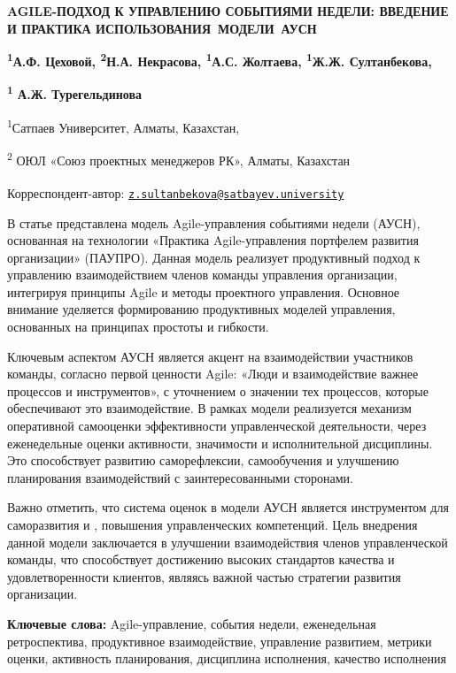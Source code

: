 


{\bfseries AGILE-ПОДХОД К УПРАВЛЕНИЮ СОБЫТИЯМИ НЕДЕЛИ: ВВЕДЕНИЕ И ПРАКТИКА
ИСПОЛЬЗОВАНИЯ~МОДЕЛИ~АУСН}

{\bfseries \textsuperscript{1}А.Ф. Цеховой, \textsuperscript{2}Н.А.
Некрасова, \textsuperscript{1}А.С. Жолтаева, \textsuperscript{1}Ж.Ж.
Султанбекова\textsuperscript{\envelope },}

{\bfseries \textsuperscript{1} А.Ж. Турегельдинова}

\textsuperscript{1}Сатпаев Университет, Алматы, Казахстан,

\textsuperscript{2} ОЮЛ «Союз проектных менеджеров РК», Алматы,
Казахстан

{\bfseries \textsuperscript{\envelope }}Корреспондент-автор:
\href{mailto:z.sultanbekova@satbayev.university}{\nolinkurl{z.sultanbekova@satbayev.university}}

В статье представлена модель Agile-управления событиями недели (АУСН),
основанная на технологии «Практика Agile-управления портфелем развития
организации» (ПАУПРО). Данная модель реализует продуктивный подход к
управлению взаимодействием членов команды управления организации,
интегрируя принципы Agile и методы проектного управления. Основное
внимание уделяется формированию продуктивных моделей управления,
основанных на принципах простоты и гибкости.

Ключевым аспектом АУСН является акцент на взаимодействии участников
команды, согласно первой ценности Agile: «Люди и взаимодействие важнее
процессов и инструментов», с уточнением о значении тех процессов,
которые обеспечивают это взаимодействие. В рамках модели реализуется
механизм оперативной самооценки эффективности управленческой
деятельности, через еженедельные оценки активности, значимости и
исполнительной дисциплины. Это способствует развитию саморефлексии,
самообучения и улучшению планирования взаимодействий с заинтересованными
сторонами.

Важно отметить, что система оценок в модели АУСН является инструментом
для саморазвития и , повышения управленческих компетенций. Цель
внедрения данной модели заключается в улучшении взаимодействия членов
управленческой команды, что способствует достижению высоких стандартов
качества и удовлетворенности клиентов, являясь важной частью стратегии
развития организации.

{\bfseries Ключевые слова:} Agile-управление, события недели, еженедельная
ретроспектива, продуктивное взаимодействие, управление развитием,
метрики оценки, активность планирования, дисциплина исполнения, качество
исполнения

